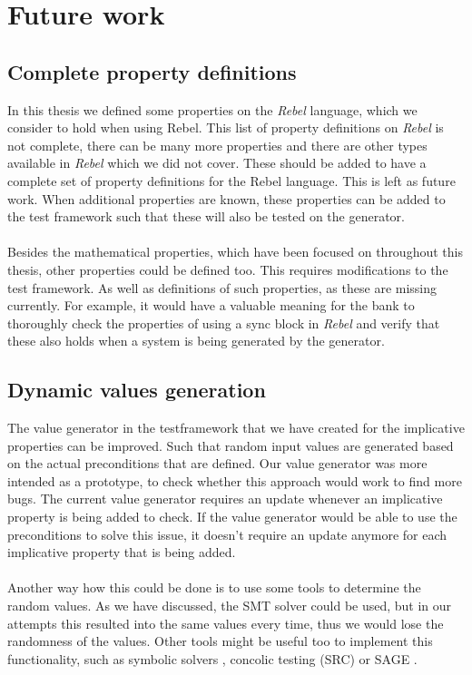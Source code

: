 \section{Future work}
\subsection*{Complete property definitions}
In this thesis we defined some properties on the \textit{Rebel} language, which we consider to hold when using Rebel. This list of property definitions on \textit{Rebel} is not complete, there can be many more properties and there are other types available in \textit{Rebel} which we did not cover. These should be added to have a complete set of property definitions for the Rebel language. This is left as future work. When additional properties are known, these properties can be added to the test framework such that these will also be tested on the generator.\\
\\
Besides the mathematical properties, which have been focused on throughout this thesis, other properties could be defined too. This requires modifications to the test framework. As well as definitions of such properties, as these are missing currently. For example, it would have a valuable meaning for the bank to thoroughly check the properties of using a sync block in \textit{Rebel} and verify that these also holds when a system is being generated by the generator.

\subsection*{Dynamic values generation}
The value generator in the testframework that we have created for the implicative properties can be improved. Such that random input values are generated based on the actual preconditions that are defined. Our value generator was more intended as a prototype, to check whether this approach would work to find more bugs. The current value generator requires an update whenever an implicative property is being added to check. If the value generator would be able to use the preconditions to solve this issue, it doesn't require an update anymore for each implicative property that is being added.\\
\\
Another way how this could be done is to use some tools to determine the random values. As we have discussed, the SMT solver could be used, but in our attempts this resulted into the same values every time, thus we would lose the randomness of the values. Other tools might be useful too to implement this functionality, such as symbolic solvers , concolic testing (SRC) or SAGE . 


